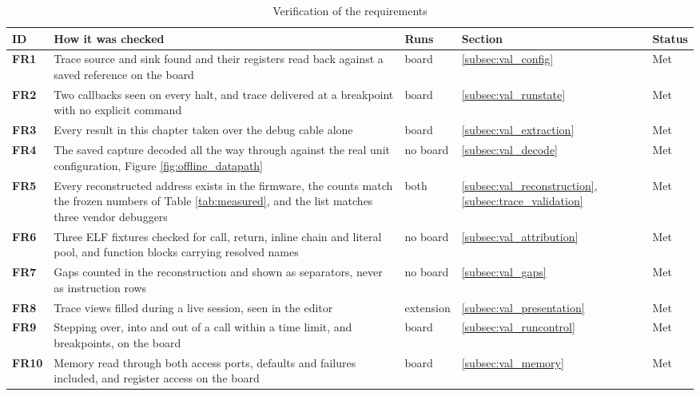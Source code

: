 \begin{table}[htbp]
    \centering
    \caption{Verification of the requirements}
    \label{tab:verification}
    \begin{tabularx}{\linewidth}{| @{}>{\hsize\bfseries}Y | >{\hsize}Y | >{\hsize}Y | >{\hsize}Y | >{\hsize}Y@{} |}
        \hline
        ID & \textbf{How it was checked} & \textbf{Runs} & \textbf{Section} & \textbf{Status} \\
        \hline
        FR1 & Trace source and sink found and their registers read back against a saved reference on the board & board & \ref{subsec:val_config} & Met \\
        \hline
        FR2 & Two callbacks seen on every halt, and trace delivered at a breakpoint with no explicit command & board & \ref{subsec:val_runstate} & Met \\
        \hline
        FR3 & Every result in this chapter taken over the debug cable alone & board & \ref{subsec:val_extraction} & Met \\
        \hline
        FR4 & The saved capture decoded all the way through against the real unit configuration, Figure \ref{fig:offline_datapath} & no board & \ref{subsec:val_decode} & Met \\
        \hline
        FR5 & Every reconstructed address exists in the firmware, the counts match the frozen numbers of Table \ref{tab:measured}, and the list matches three vendor debuggers & both & \ref{subsec:val_reconstruction}, \ref{subsec:trace_validation} & Met \\
        \hline
        FR6 & Three ELF fixtures checked for call, return, inline chain and literal pool, and function blocks carrying resolved names & no board & \ref{subsec:val_attribution} & Met \\
        \hline
        FR7 & Gaps counted in the reconstruction and shown as separators, never as instruction rows & no board & \ref{subsec:val_gaps} & Met \\
        \hline
        FR8 & Trace views filled during a live session, seen in the editor & extension & \ref{subsec:val_presentation} & Met \\
        \hline
        FR9 & Stepping over, into and out of a call within a time limit, and breakpoints, on the board & board & \ref{subsec:val_runcontrol} & Met \\
        \hline
        FR10 & Memory read through both access ports, defaults and failures included, and register access on the board & board & \ref{subsec:val_memory} & Met \\

\end{tabularx}
\end{table}
